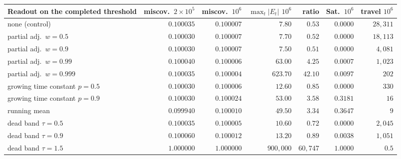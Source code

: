 \begin{table}[!ht]
\label{tab:forfeit}
\begin{tabular}{@{}lrrrrrr@{}}
\toprule
Readout on the completed threshold & miscov.\ $2{\times}10^5$ & miscov.\ $10^6$ &
$\max_t|E_t|$ $10^6$ & ratio & Sat.\ $10^6$ & travel $10^6$ \\
\midrule
none (control)                & $0.100035$ & $0.100007$ & $7.80$        & $0.53$     & $0.0000$ & $28{,}311$ \\
partial adj.\ $w = 0.5$       & $0.100030$ & $0.100007$ & $7.70$        & $0.52$     & $0.0000$ & $18{,}113$ \\
partial adj.\ $w = 0.9$       & $0.100030$ & $0.100007$ & $7.50$        & $0.51$     & $0.0000$ & $4{,}081$ \\
partial adj.\ $w = 0.99$      & $0.100040$ & $0.100006$ & $63.00$       & $4.25$     & $0.0007$ & $1{,}023$ \\
partial adj.\ $w = 0.999$     & $0.100035$ & $\mathbf{0.100004}$ & $623.70$      & $42.10$    & $0.0097$ & $202$ \\
growing time constant $p=0.5$ & $0.100030$ & $0.100006$ & $12.60$       & $0.85$     & $0.0000$ & $330$ \\
growing time constant $p=0.9$ & $0.100030$ & $0.100024$ & $53.00$       & $3.58$     & $0.3181$ & $16$ \\
running mean                  & $0.099940$ & $0.100010$ & $49.50$       & $3.34$     & $0.3647$ & $9$ \\
dead band $\tau = 0.5$        & $0.100035$ & $0.100005$ & $10.60$       & $0.72$     & $0.0000$ & $2{,}045$ \\
dead band $\tau = 0.9$        & $0.100060$ & $0.100012$ & $13.20$       & $0.89$     & $0.0038$ & $1{,}051$ \\
dead band $\tau = 1.5$        & $\mathbf{1.000000}$ & $\mathbf{1.000000}$ & $900{,}000$ & $60{,}747$ & $1.0000$ & $0.5$ \\
\bottomrule
\end{tabular}
\end{table}


